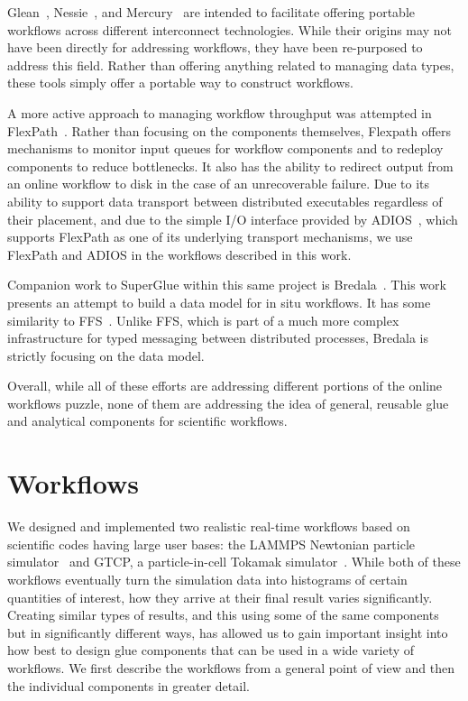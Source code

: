 \documentclass[conference]{IEEEtran}
\begin{document}
Glean~\cite{vishwanath:2011:glean}, Nessie~\cite{oldfield:lwfs-data-movement},
and Mercury~\cite{Soumagne:2013:mercury} are intended to facilitate offering
portable workflows across different interconnect technologies. While their
origins may not have been directly for addressing workflows, they have been
re-purposed to address this field. Rather than offering anything related to
managing data types, these tools simply offer a portable way to construct
workflows.

A more active approach to managing workflow throughput was attempted in
FlexPath~\cite{Dayal:2014:flexpath}. Rather than focusing on the components
themselves, Flexpath offers mechanisms to monitor input queues for workflow
components and to redeploy components to reduce bottlenecks. It also has the
ability to redirect output from an online workflow to disk in the case of an
unrecoverable failure. Due to its ability to support data transport between
distributed executables regardless of their placement, and due to the simple I/O
interface provided by ADIOS~\cite{lofstead:2009:adaptable},
which supports FlexPath as one of its underlying
transport mechanisms, we use FlexPath and ADIOS in the workflows described
in this work.

Companion work to SuperGlue within this same project is
Bredala~\cite{dreher:2016:bredala}. This work presents an attempt to build a
data model for in situ workflows. It has some similarity to
FFS~\cite{eisenhauer:2011:ffs}. Unlike FFS, which is part of a much more
complex infrastructure for typed messaging between distributed processes,
Bredala is strictly focusing on the data model.

Overall, while all of these efforts are addressing different portions of the
online workflows puzzle, none of them are addressing the idea of general,
reusable glue and analytical components for scientific workflows.

\section{Workflows}
\label{s:workflow}

We designed and implemented two realistic real-time workflows based on
scientific codes having large user bases: the LAMMPS Newtonian particle
simulator~\cite{plimpton:1997:lammps} and GTCP, a particle-in-cell Tokamak
simulator~\cite{lin:gtc}. While both of these workflows eventually turn the
simulation data into histograms of certain quantities of interest, how they
arrive at their final result varies significantly. Creating similar types of
results, and this using some of the same components but in significantly
different ways, has allowed us to gain important insight into how best to
design glue components that can be used in a wide variety of workflows. We
first describe the workflows from a general point of view and then the
individual components in greater detail.
\end{document}
